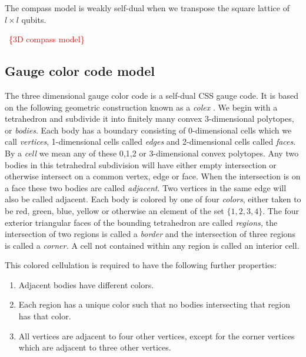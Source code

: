 \documentclass[11pt,oneside]{article}
\newcommand{\todo}[1]{\ \textcolor{red}{\{#1\}}\ }
\begin{document}
The compass model is weakly self-dual when we transpose
the square lattice of $l\times l$ qubits.

\todo{3D compass model}

\subsection{Gauge color code model}

The three dimensional gauge color code \cite{Bombin2015,Bombin2015single,Kubica2015}
is a self-dual CSS gauge code. 
It is based on the following geometric construction known
as a \emph{colex} \cite{Bombin2007exact}.
We begin with a tetrahedron and subdivide it into finitely many
convex 3-dimensional polytopes, or \emph{bodies}.
Each body has a boundary consisting of 0-dimensional cells
which we call \emph{vertices}, 1-dimensional cells called \emph{edges}
and 2-dimensional cells called \emph{faces}.
By a \emph{cell} we mean any of these 0,1,2 or 3-dimensional convex polytopes.
Any two bodies in this tetrahedral subdivision will
have either empty intersection or otherwise intersect
on a common vertex, edge or face.
When the intersection is on a face these two bodies
are called \emph{adjacent}.
Two vertices in the same edge will also be called adjacent.
Each body is colored by one of four \emph{colors},
either taken to be red, green, blue, yellow or 
otherwise an element of the set $\{1, 2, 3, 4\}.$
The four exterior triangular faces of the bounding tetrahedron are
called \emph{regions,} the intersection of two regions is called
a \emph{border} and the intersection of three regions is called
a \emph{corner.}
A cell not contained within any region is called an interior cell.

This colored cellulation is required to have the following further properties:
\begin{enumerate}
\item Adjacent bodies have different colors.
\item Each region has a unique color 
such that no bodies intersecting that region has that color.
\item All vertices are adjacent to four other vertices,
except for the corner vertices which are adjacent to three other vertices.
\end{enumerate}
\end{document}
